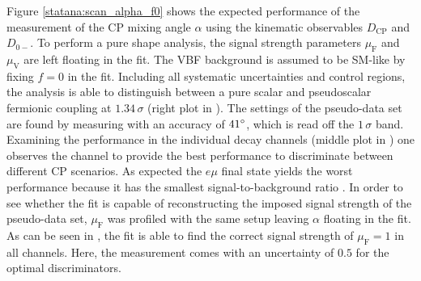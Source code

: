 Figure \ref{statana:scan_alpha_f0} shows the expected performance of the measurement of the CP mixing angle $\alpha$ using the kinematic observables $D_\text{CP}$ and $D_{0-}$. 
To perform a pure shape analysis, the signal strength parameters $\mu_\text{F}$ and $\mu_\text{V}$ are 
left floating in the fit. The VBF background is assumed to be SM-like by fixing $f=0$ in the fit. Including all systematic uncertainties and control regions, the analysis is able to distinguish 
between a pure scalar and pseudoscalar fermionic coupling at $\text{1.34}\,\sigma$ (right plot in ). The settings of the pseudo-data set are found by measuring \alpha{} with an accuracy of $\text{41}^{\circ}$, which is read off the $1\,\sigma$ band. Examining the performance in the individual decay channels (middle plot in  )
one observes the \tautau{} channel to provide the best performance to discriminate between different CP scenarios. As expected the $e\mu$ final state yields the worst performance because it has the smallest signal-to-background ratio .
In order to see whether the fit is capable of reconstructing the imposed signal strength of the pseudo-data set, $\mu_\text{F}$ was profiled with the same setup leaving $\alpha$ floating in the fit.
 As can be seen in , the fit is able to find the correct signal strength of $\mu_\text{F}=1$ in all channels. Here, the measurement comes with an uncertainty of $0.5$ for the optimal discriminators. 

